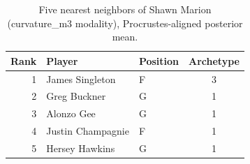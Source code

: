 \begin{table}[htbp]
  \centering\small
  \begin{tabular}{rllc}
    \toprule
    Rank & Player & Position & Archetype \\
    \midrule
    1 & James Singleton & F & 3 \\
    2 & Greg Buckner & G & 1 \\
    3 & Alonzo Gee & G & 1 \\
    4 & Justin Champagnie & F & 1 \\
    5 & Hersey Hawkins & G & 1 \\
    \bottomrule
  \end{tabular}
  \caption{Five nearest neighbors of Shawn Marion (curvature_m3 modality), Procrustes-aligned posterior mean.}
  \label{tab:Shawn_Marion_neighbors_curvature_m3}
\end{table}

